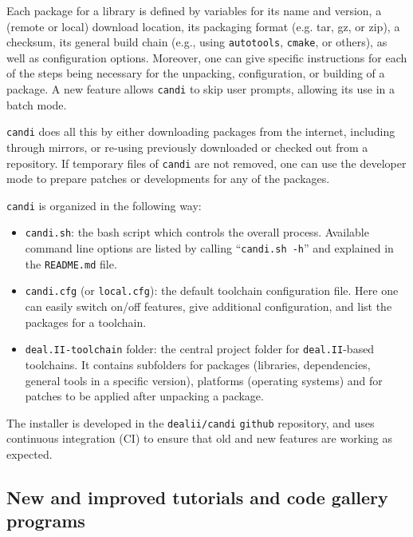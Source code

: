\documentclass{ansarticle-preprint}
\newcommand{\specialword}[1]{\texttt{#1}}
\newcommand{\dealii}{{\specialword{deal.II}}\xspace}
\newcommand{\candi}{{\specialword{candi}}\xspace}
\begin{document}
Each package for a library is defined by variables for its name and version,
a (remote or local) download location,
its packaging format (e.g. tar, gz, or zip),
a checksum,
its general build chain (e.g., using \texttt{autotools}, \texttt{cmake}, or others),
as well as configuration options.
Moreover, one can give specific instructions for each of the steps being
necessary for the unpacking, configuration, or building of a package.
A new feature allows \candi{} to skip user prompts, allowing its use in
a batch mode.

\candi{} does all this by either downloading packages from the
internet, including through mirrors, or re-using previously downloaded
or checked out from a repository.
If temporary files of \candi{} are not removed, one can use the developer
mode to prepare patches or developments for any of the packages.

\candi{} is organized in the following way:
\begin{itemize}
\item \texttt{candi.sh}: the bash script which controls the overall process.
Available command line options are listed by calling ``\texttt{candi.sh -h}''
and explained in the \texttt{README.md} file.

\item \texttt{candi.cfg} (or \texttt{local.cfg}): the default toolchain
configuration file. Here one can easily switch on/off features,
give additional configuration, and
list the packages for a toolchain.

\item \texttt{deal.II-toolchain} folder: the central project folder for
\dealii{}-based toolchains.
It contains subfolders
for packages (libraries, dependencies, general tools in a specific version),
platforms (operating systems) and
for patches to be applied after unpacking a package.
\end{itemize}

The installer is developed in the \texttt{dealii/candi}
\texttt{github} repository, and uses continuous
integration (CI) to ensure that old and new features
are working as expected.


\subsection{New and improved tutorials and code gallery programs}
\label{subsec:steps}
\end{document}
